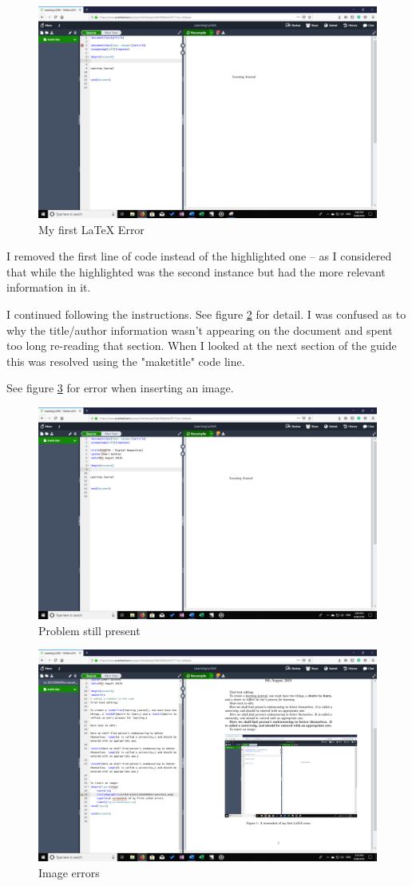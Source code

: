 \documentclass{article}
\begin{document}
\begin{figure}[ht]
    \centering
    \includegraphics[width=12cm]{Images/Screenshot1.png}
    \caption{My first LaTeX Error}
    \label{fig:screenshot1}
\end{figure}

I removed the first line of code instead of the highlighted one – as I considered that while the highlighted was the second instance but had the more relevant information in it.

I continued following the instructions. See figure \ref{fig:screenshot2} for detail.
I was confused as to why the title/author information wasn’t appearing on the document and spent too long re-reading that section. When I looked at the next section of the guide this was resolved using the "maketitle" code line.

See figure \ref{fig:screenshot3} for error when inserting an image.


\begin{figure}[h]
    \centering
    \includegraphics[width=12cm]{Images/Screenshot2.png} 
    \caption{Problem still present}
    \label{fig:screenshot2}
\end{figure}


\begin{figure}[h]
    \centering
    \includegraphics[width=12cm]{Images/Screenshot3.png}
    \caption{Image errors}
    \label{fig:screenshot3}
\end{figure}
\end{document}
